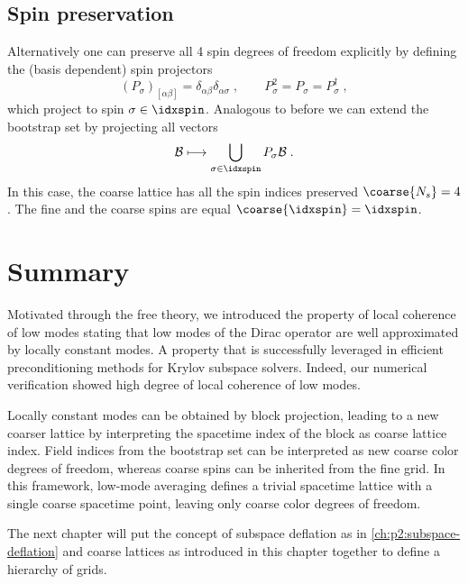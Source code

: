 \subsection{Spin preservation}

Alternatively one can preserve all \num{4} spin degrees of freedom explicitly by defining the (basis dependent) spin projectors
\begin{equation} \label{eq:spin:projectors}
(P_{\sigma})_{[\alpha \beta]} = \delta_{\alpha \beta} \delta_{\alpha \sigma} \;,
\qquad
P_{\sigma}^{2} = P_{\sigma} = P_{\sigma}^{\dagger} \;,
\end{equation}
which project to spin $\sigma \in \idxspin$.
Analogous to before we can extend the bootstrap set by projecting all vectors
\begin{equation} \label{eq:bootstrap:spin}
\mathcal{B} \longmapsto \bigcup_{\sigma \in \idxspin} P_{\sigma} \mathcal{B} \;.
\end{equation}
In this case, the coarse lattice has all the spin indices preserved $\coarse{N_s} = 4$.
The fine and the coarse spins are equal $\coarse{\idxspin} = \idxspin$.

\section{Summary}
\label{sec:lc:summary}

Motivated through the free theory, we introduced the property of local coherence of low modes stating that low modes of the Dirac operator are well approximated by locally constant modes.
A property that is successfully leveraged in efficient preconditioning methods for Krylov subspace solvers.
Indeed, our numerical verification showed high degree of local coherence of low modes.

Locally constant modes can be obtained by block projection, leading to a new coarser lattice by interpreting the spacetime index of the block as coarse lattice index.
Field indices from the bootstrap set can be interpreted as new coarse color degrees of freedom, whereas coarse spins can be inherited from the fine grid.
In this framework, low-mode averaging defines a trivial spacetime lattice with a single coarse spacetime point, leaving only coarse color degrees of freedom.

The next chapter will put the concept of subspace deflation as in \cref{ch:p2:subspace-deflation} and coarse lattices as introduced in this chapter together to define a hierarchy of grids.

